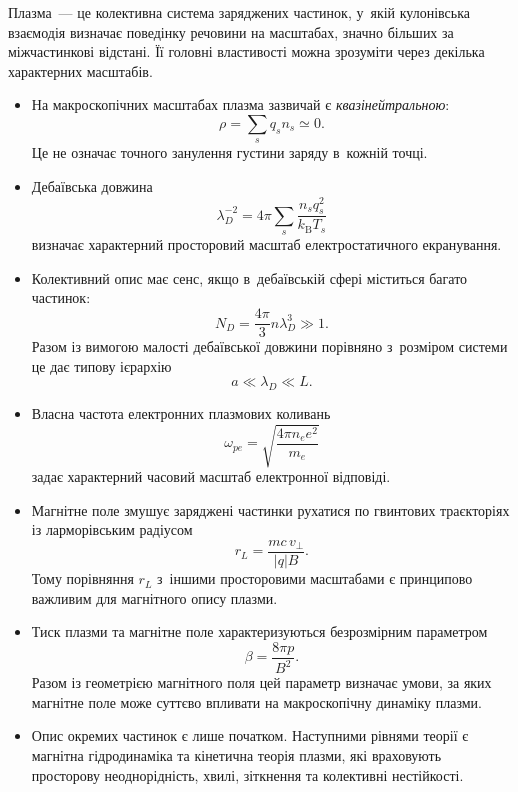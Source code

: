 Плазма~--- це колективна система заряджених частинок, у~якій кулонівська взаємодія визначає поведінку речовини на масштабах, значно більших за міжчастинкові відстані. Її головні властивості можна зрозуміти через декілька характерних масштабів.

\begin{itemize}
	\item На макроскопічних масштабах плазма зазвичай є \emph{квазінейтральною}:
	      \begin{equation*}
		      \rho=\sum_s q_s n_s\simeq0.
	      \end{equation*}
	      Це не означає точного занулення густини заряду в~кожній точці.

	\item Дебаївська довжина
	      \begin{equation*}
		      \lambda_D^{-2}
		      =4\pi\sum_s\frac{n_s q_s^2}{k_{\mathrm B}T_s}
	      \end{equation*}
	      визначає характерний просторовий масштаб електростатичного екранування.

	\item Колективний опис має сенс, якщо в~дебаївській сфері міститься багато частинок:
	      \begin{equation*}
		      N_D=\frac{4\pi}{3}n\lambda_D^3\gg1.
	      \end{equation*}
	      Разом із вимогою малості дебаївської довжини порівняно з~розміром системи це дає типову ієрархію
	      \begin{equation*}
		      a\ll\lambda_D\ll L.
	      \end{equation*}

	\item Власна частота електронних плазмових коливань
	      \begin{equation*}
		      \omega_{pe}
		      =\sqrt{\frac{4\pi n_e e^2}{m_e}}
	      \end{equation*}
	      задає характерний часовий масштаб електронної відповіді.

	\item Магнітне поле змушує заряджені частинки рухатися по гвинтових траєкторіях із ларморівським радіусом
	      \begin{equation*}
		      r_L=\frac{mc\,v_\perp}{|q|B}.
	      \end{equation*}
	      Тому порівняння $r_L$ з~іншими просторовими масштабами є принципово важливим для магнітного опису плазми.

	\item Тиск плазми та магнітне поле характеризуються безрозмірним параметром
	      \begin{equation*}
		      \beta=\frac{8\pi p}{B^2}.
	      \end{equation*}
	      Разом із геометрією магнітного поля цей параметр визначає умови, за яких магнітне поле може суттєво впливати на макроскопічну динаміку плазми.

	\item Опис окремих частинок є лише початком. Наступними рівнями теорії є магнітна гідродинаміка та кінетична теорія плазми, які враховують просторову неоднорідність, хвилі, зіткнення та колективні нестійкості.
\end{itemize}

